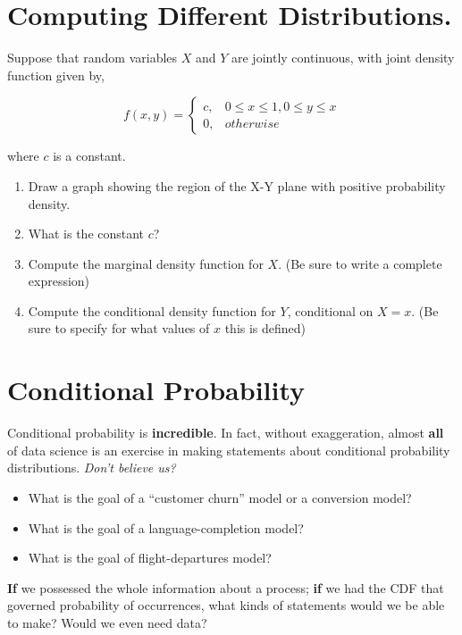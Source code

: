 \documentclass[
]{book}
\providecommand{\tightlist}{%
  \setlength{\itemsep}{0pt}\setlength{\parskip}{0pt}}
\theoremstyle{definition}
\theoremstyle{definition}
\theoremstyle{definition}
\theoremstyle{definition}
\theoremstyle{remark}
\begin{document}
\hypertarget{computing-different-distributions.}{%
\section{Computing Different Distributions.}\label{computing-different-distributions.}}

Suppose that random variables \(X\) and \(Y\) are jointly continuous, with joint density function given by,

\[
f(x,y) = 
  \begin{cases}
    c, & 0 \leq x \leq 1, 0 \leq y \leq x \\
    0, & otherwise
\end{cases}
\]

where \(c\) is a constant.

\begin{enumerate}
\def\labelenumi{\arabic{enumi}.}
\tightlist
\item
  Draw a graph showing the region of the X-Y plane with positive probability density.
\item
  What is the constant \(c\)?
\item
  Compute the marginal density function for \(X\). (Be sure to write a complete expression)
\item
  Compute the conditional density function for \(Y\), conditional on \(X=x\). (Be sure to specify for what values of \(x\) this is defined)
\end{enumerate}

\hypertarget{conditional-probability}{%
\section{Conditional Probability}\label{conditional-probability}}

Conditional probability is \textbf{incredible}. In fact, without exaggeration, almost \textbf{all} of data science is an exercise in making statements about conditional probability distributions. \emph{Don't believe us?}

\begin{itemize}
\tightlist
\item
  What is the goal of a ``customer churn'' model or a conversion model?
\item
  What is the goal of a language-completion model?
\item
  What is the goal of flight-departures model?
\end{itemize}

\textbf{If} we possessed the whole information about a process; \textbf{if} we had the CDF that governed probability of occurrences, what kinds of statements would we be able to make? Would we even need data?
\end{document}
